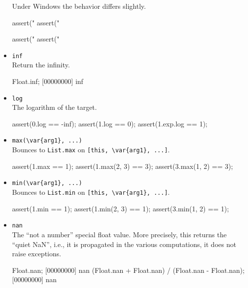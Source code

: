 \begin{itemize}
  \begin{windows}
    Under Windows the behavior differs slightly.
  \end{windows}
\begin{urbiscript}[firstnumber=last]
assert("%
assert("%

assert("%
assert("%
\end{urbiscript}

\item \lstinline|inf|\\
  Return the infinity.
\begin{urbiscript}[firstnumber=last]
Float.inf;
[00000000] inf
\end{urbiscript}

\item \lstinline|log|\\
  The logarithm of the target.
\begin{urbiscript}[firstnumber=last]
assert(0.log == -inf);
assert(1.log == 0);
assert(1.exp.log == 1);
\end{urbiscript}

\item \lstinline|max(\var{arg1}, ...)|\\
  Bounces to \lstinline|List.max| on \lstinline|[this, \var{arg1}, ...]|.
\begin{urbiscript}[firstnumber=last]
assert(1.max == 1);
assert(1.max(2, 3) == 3);
assert(3.max(1, 2) == 3);
\end{urbiscript}

\item \lstinline|min(\var{arg1}, ...)|\\
  Bounces to \lstinline|List.min| on \lstinline|[this, \var{arg1}, ...]|.
\begin{urbiscript}[firstnumber=last]
assert(1.min == 1);
assert(1.min(2, 3) == 1);
assert(3.min(1, 2) == 1);
\end{urbiscript}

\item \lstinline|nan|\\
  The ``not a number'' special float value.  More precisely, this
  returns the ``quiet NaN'', i.e., it is propagated in the various
  computations, it does not raise exceptions.
\begin{urbiscript}[firstnumber=last]
Float.nan;
[00000000] nan
(Float.nan + Float.nan) / (Float.nan - Float.nan);
[00000000] nan
\end{urbiscript}


\end{itemize}
